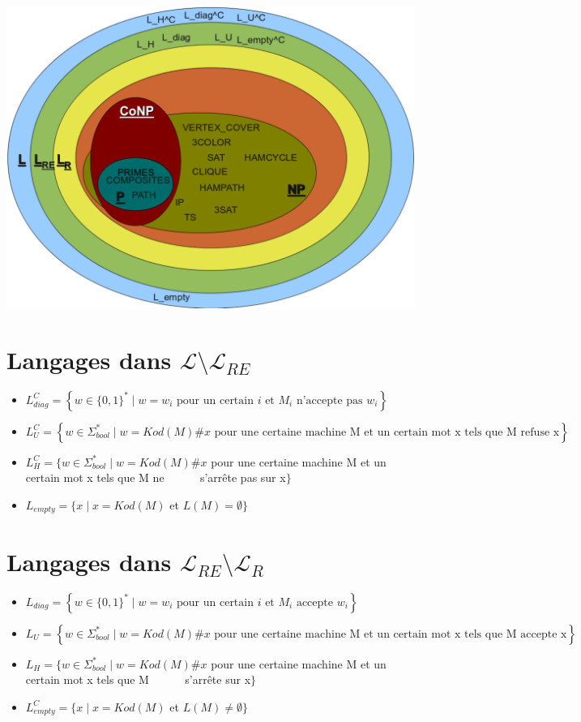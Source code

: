 \documentclass{article}
\begin{document}
\begin{sffamily}

\includegraphics[scale=0.45]{cc.pdf}

\section*{Langages dans $\mathcal{L} \setminus \mathcal{L}_{RE}$}

\begin{itemize}
\item $L_{diag}^C = \left\{w \in \{0,1\}^* \mid w = w_i \text{ pour un certain }i \text{ et } M_i \text{ n'accepte pas } 
w_i\right\}$
\item $L_U^C = \left\{w \in \Sigma^*_{bool} \mid w = Kod(M)\#x \text{ pour une certaine machine M et un certain mot x tels 
que M refuse x}\right\} $
\item $L_H^C = \{w \in \Sigma^*_{bool} \mid w = Kod(M)\#x $ pour une certaine machine M et un certain mot x tels 
que M ne \indent$\qquad\,\,\, $ s'arrête pas sur x$\} $
\item $L_{empty} = \{ x \mid x = Kod(M)$ et $L(M)=\emptyset\}$
\end{itemize}

\section*{Langages dans $\mathcal{L}_{RE} \setminus \mathcal{L}_{R}$}

\begin{itemize}
\item $L_{diag} = \left\{w \in \{0,1\}^* \mid w = w_i \text{ pour un certain }i \text{ et } M_i \text{ accepte } w_i\right\}$
\item $L_U = \left\{w \in \Sigma^*_{bool} \mid w = Kod(M)\#x \text{ pour une certaine machine M et un certain mot x tels 
que M accepte x}\right\} $
\item $L_H = \{w \in \Sigma^*_{bool} \mid w = Kod(M)\#x $ pour une certaine machine M et un certain mot x tels 
que M \indent$\qquad\,\,\, $ s'arrête sur x$\} $
\item $L_{empty}^C = \{ x \mid x = Kod(M)$ et $L(M)\neq\emptyset\}$
\end{itemize}


\end{sffamily}
\end{document}
